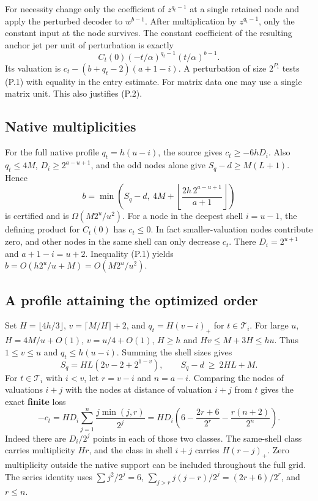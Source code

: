 \documentclass[
  11pt,
]{article}
\begin{document}
For necessity change only the coefficient of \(z^{q_t-1}\) at a single
retained node and apply the perturbed decoder to \(w^{b-1}\). After
multiplication by \(z^{q_t-1}\), only the constant input at the node
survives. The constant coefficient of the resulting anchor jet per unit
of perturbation is exactly \[
      C_t(0)(-t/\alpha)^{q_t-1}(t/\alpha)^{b-1}.          \tag{P.3}
\] Its valuation is \(c_t-(b+q_t-2)(a+1-i)\). A perturbation of size
\(2^{P_i}\) tests (P.1) with equality in the entry estimate. For matrix
data one may use a single matrix unit. This also justifies (P.2).

\subsection{Native multiplicities}\label{native-multiplicities}

For the full native profile \(q_t=h(u-i)\), the source gives
\(c_t\ge-6hD_i\). Also \(q_t\le4M\), \(D_i\ge2^{a-u+1}\), and the odd
nodes alone give \(S_q-d\ge M(L+1)\). Hence \[
 b=\min\!\left(S_q-d,\ 4M+
          \left\lfloor \frac{2h\,2^{a-u+1}}{a+1}\right\rfloor\right)
\] is certified and is \(\Omega(M2^u/u^2)\). For a node in the deepest
shell \(i=u-1\), the defining product for \(C_t(0)\) has \(c_t\le0\). In
fact smaller-valuation nodes contribute zero, and other nodes in the
same shell can only decrease \(c_t\). There \(D_i=2^{u+1}\) and
\(a+1-i=u+2\). Inequality (P.1) yields \(b=O(h2^u/u+M)=O(M2^u/u^2)\).

\subsection{A profile attaining the optimized
order}\label{a-profile-attaining-the-optimized-order}

Set \(H=\lfloor4h/3\rfloor\), \(v=\lceil M/H\rceil+2\), and
\(q_t=H(v-i)_+\) for \(t\in\mathcal T_i\). For large \(u\),
\(H=4M/u+O(1)\), \(v=u/4+O(1)\), \(H\ge h\) and \(Hv\le M+3H\le hu\).
Thus \(1\le v\le u\) and \(q_t\le h(u-i)\). Summing the shell sizes
gives \[
 S_q=HL(2v-2+2^{1-v}),\qquad S_q-d\ \ge\ 2HL+M.         \tag{P.4}
\] For \(t\in\mathcal T_i\) with \(i<v\), let \(r=v-i\) and \(n=a-i\).
Comparing the nodes of valuations \(i+j\) with the nodes at distance of
valuation \(i+j\) from \(t\) gives the exact \textbf{finite} loss \[
 -c_t=H D_i\sum_{j=1}^{n}\frac{j\min(j,r)}{2^j}
     =H D_i\!\left(6-\frac{2r+6}{2^r}
                          -\frac{r(n+2)}{2^n}\right).       \tag{P.5}
\] Indeed there are \(D_i/2^j\) points in each of those two classes. The
same-shell class carries multiplicity \(Hr\), and the class in shell
\(i+j\) carries \(H(r-j)_+\). Zero multiplicity outside the native
support can be included throughout the full grid. The series identity
uses \(\sum j^2/2^j=6\), \(\sum_{j>r}j(j-r)/2^j=(2r+6)/2^r\), and
\(r\le n\).
\end{document}
